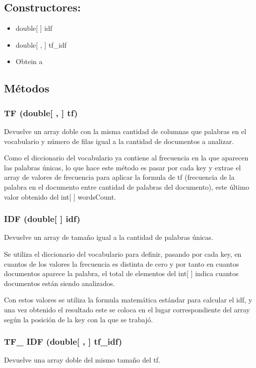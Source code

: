\documentclass[a4paper,12pt,]{article}
\begin{document}
\subsection*{Constructores:}
\begin{itemize}
    \item double[ ] idf
    \item double[ , ] tf\_idf
    \item Obtein a
\end{itemize}

\subsection*{Métodos}

\subsubsection*{TF (double[ , ] tf)}
Devuelve un array doble con la misma cantidad de columnas que palabras en el vocabulario y número de filas igual 
a la cantidad de documentos a analizar.

Como el diccionario del vocabulario ya contiene al frecuencia en la que aparecen las palabras únicas, lo que 
hace este método es pasar por cada key y extrae el array de valores de frecuencia para aplicar la formula de tf 
(frecuencia de la palabra en el documento entre cantidad de palabras del documento), este último valor obtenido 
del int[ ] wordsCount.

\subsubsection*{IDF (double[ ] idf)}
Devuelve un array de tamaño igual a la cantidad de palabras únicas.

Se utiliza el diccionario del vocabulario para definir, pasando por cada key, en cuantos de los valores la 
frecuencia es distinta de cero y por tanto en cuantos documentos aparece la palabra, el total de elementos del 
int[ ] indica cuantos documentos están siendo analizados.

Con estos valores se utiliza la formula matemática estándar para calcular el idf, y una vez obtenido el resultado 
este se coloca en el lugar correspondiente del array según la posición de la key con la que se trabajó.

\subsubsection*{TF\_ IDF (double[ , ] tf\_idf)}
Devuelve una array doble del mismo tamaño del tf.
\end{document}
